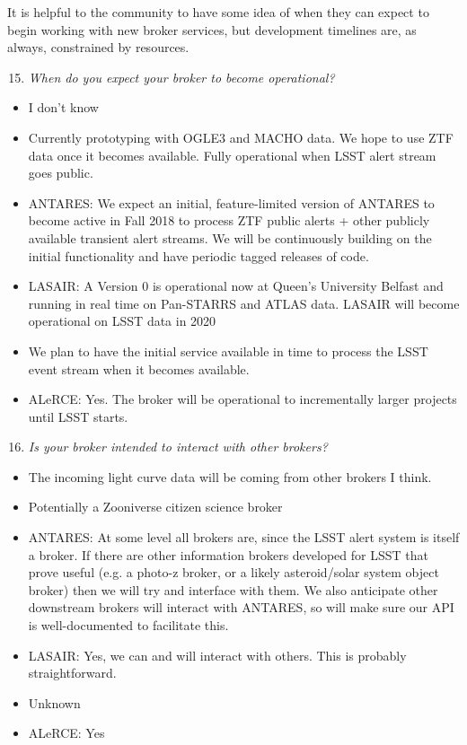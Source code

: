 \documentclass{article}
\begin{document}
It is helpful to the community to have some idea of when they can expect to begin working with new broker services, but development timelines are, as always, constrained by resources.  

\begin{enumerate}
\setcounter{enumi}{14}
\item {\em When do you expect your broker to become operational?}
\end{enumerate}

\begin{itemize}
\item I don't know
\item Currently prototyping with OGLE3 and MACHO data.  We hope to use ZTF data once it becomes available.  Fully operational when LSST alert stream goes public.
\item ANTARES: We expect an initial, feature-limited version of ANTARES to become active in Fall 2018 to process ZTF public alerts + other publicly available transient alert streams. We will be continuously building on the initial functionality and have periodic tagged releases of code.
\item LASAIR: A Version 0 is operational now at Queen's University Belfast and running in real time on Pan-STARRS and ATLAS data. LASAIR will become operational on LSST data in 2020
\item We plan to have the initial service available in time to process the LSST event stream when it becomes available. 
\item ALeRCE: Yes. The broker will be operational to incrementally larger projects until LSST starts.
\end{itemize}

\begin{enumerate}
\setcounter{enumi}{15}
\item {\em Is your broker intended to interact with other brokers?}
\end{enumerate}

\begin{itemize}
\item The incoming light curve data will be coming from other brokers I think. 
\item Potentially a Zooniverse citizen science broker
\item ANTARES: At some level all brokers are, since the LSST alert system is itself a broker. If there are other information brokers developed for LSST that prove useful (e.g. a photo-z broker, or a likely asteroid/solar system object broker) then we will try and interface with them. We also anticipate other downstream brokers will interact with ANTARES, so will make sure our API is well-documented to facilitate this. 
\item LASAIR: Yes, we can and will interact with others. This is probably straightforward. 
\item Unknown
\item ALeRCE: Yes
\end{itemize}
\end{document}
